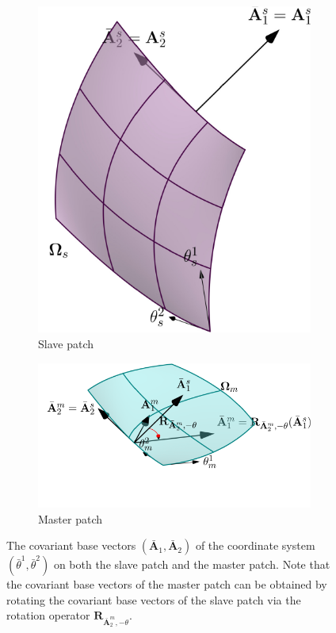 \begin{figure}[ht]
	\centering
	\begin{subfigure}[t]{0.4\textwidth}
		\centering
		\includegraphics[scale = .7]{master_patch}
		\caption{Slave patch}
	\end{subfigure}
	\begin{subfigure}[t]{0.58\textwidth}
		\centering
		\includegraphics[trim=.2cm .5cm 0 0, clip, scale = .9]{slave_patch}
		\caption{Master patch}
	\end{subfigure}
	\caption{ The covariant base vectors $(\bar{\mathbf{A}}_1, \bar{\mathbf{A}}_2)$ of the coordinate system $(\bar{\theta}^1, \bar{\theta}^2)$ on both the slave patch and the master patch. Note that the covariant base vectors of the master patch can be obtained by rotating the covariant base vectors of the slave patch via the rotation operator $\mathbf{R}_{\bar{\mathbf{A}}^m_2,-\theta}$. }\label{fig:coordinate_system_on_each_patch}
\end{figure}

